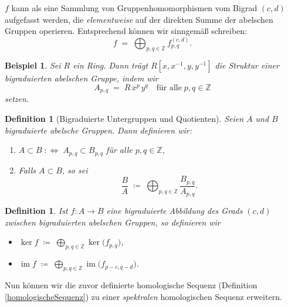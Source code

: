 \documentclass[12pt, hidelinks]{article}
\numberwithin{conj}{section}
\newtheorem{definition}[conj]{Definition}
\newtheorem{example}[conj]{Beispiel}
\newcommand{\Z}{\mathbb{Z}}
\newcommand{\ima}{\operatorname{im}}
\begin{document}
$f$ kann als eine Sammlung von Gruppenhomomorphismen vom Bigrad $(c,d)$ aufgefasst werden, die \emph{elementweise} auf der direkten Summe der abelschen Gruppen operieren. Entsprechend können wir sinngemäß schreiben:
\[
    f \;=\; \bigoplus_{p,q \in \Z} f^{(c,d)}_{p,q}.
\]

\begin{example}
    Sei $R$ ein Ring. Dann trägt $R[x,x^{-1},y,y^{-1}]$ die Struktur einer bigraduierten abelschen Gruppe, indem wir
    \[
        A_{p,q} \;=\; R\,x^p\,y^q
        \quad\text{für alle}\; p,q \in \Z
    \]
    setzen.
\end{example}

\begin{definition}[Bigraduierte Untergruppen und Quotienten]
    Seien $A$ und $B$ bigraduierte abelsche Gruppen. Dann definieren wir:
    \begin{enumerate}[nolistsep]
        \item $A \subset B \;\colon\Leftrightarrow\; A_{p,q} \subset B_{p,q}$ für alle $p,q \in \Z$,
        \item Falls $A \subset B$, so sei
              \[
                \displaystyle
                \frac{B}{A}
                \;\coloneqq\;
                \bigoplus_{p,q \in \Z}
                \frac{B_{p,q}}{A_{p,q}}.
              \]
    \end{enumerate}
\end{definition}

\begin{definition}
    Ist $f: A \to B$ eine bigraduierte Abbildung des Grads $(c,d)$ zwischen bigraduierten abelschen Gruppen, so definieren wir
    \begin{itemize}[nolistsep]
        \item $\displaystyle \ker f \;\coloneqq\; \bigoplus_{p,q \in \Z} \ker \bigl(f_{p,q}\bigr)$,
        \item $\displaystyle \ima f \;\coloneqq\; \bigoplus_{p,q \in \Z} \ima \bigl(f_{p-c,q-d}\bigr)$.
    \end{itemize}
\end{definition}

Nun können wir die zuvor definierte homologische Sequenz (Definition \ref{homologischeSequenz}) zu einer \emph{spektralen} homologischen Sequenz erweitern.
\end{document}
